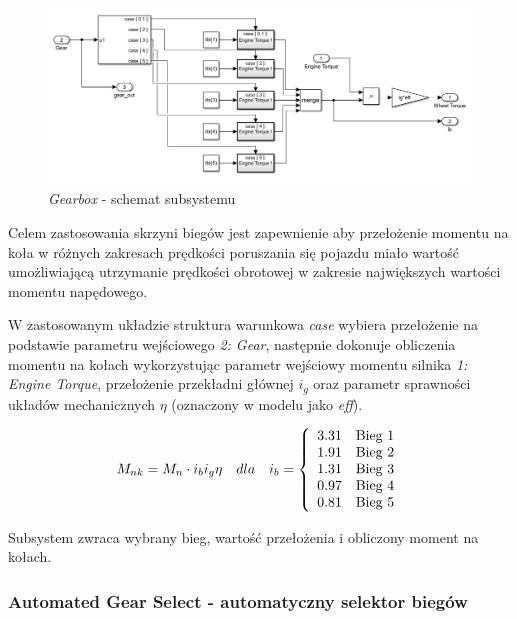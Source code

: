 \documentclass[12pt, a4paper, headings=normal]{article}
\begin{document}
\begin{figure}[H]
	\centering
	\includegraphics[width=\textwidth]{gearbox.png}
	\caption{\textit{Gearbox} - schemat subsystemu}
	\label{fig:gearbox}
\end{figure}

Celem zastosowania skrzyni biegów jest zapewnienie aby przełożenie momentu na koła
w różnych zakresach prędkości poruszania się pojazdu miało wartość umożliwiającą
utrzymanie prędkości obrotowej w zakresie największych wartości momentu napędowego.

W zastosowanym układzie struktura warunkowa \textit{case} wybiera przełożenie na podstawie
parametru wejściowego \textit{2: Gear}, następnie dokonuje obliczenia momentu na kołach
wykorzystując parametr wejściowy momentu silnika \textit{1: Engine Torque}, przełożenie
przekładni głównej $i_g$ oraz parametr sprawności układów mechanicznych $\eta$ (oznaczony w modelu
jako \textit{eff}). 

\begin{equation}
	\begin{array}{l c r}
		M_{nk} = M_n \cdot i_b  i_g \eta & dla & i_b =  \left\{ \begin{array}{l r}
			3.31 & \text{Bieg 1}\\
			1.91 & \text{Bieg 2}\\
			1.31 & \text{Bieg 3}\\
			0.97 & \text{Bieg 4}\\
			0.81 & \text{Bieg 5}\\
		\end{array}\right.
	\end{array}
\end{equation}

Subsystem zwraca wybrany bieg, wartość przełożenia i obliczony moment na kołach.

\subsubsection{Automated Gear Select - automatyczny selektor biegów}
\end{document}
